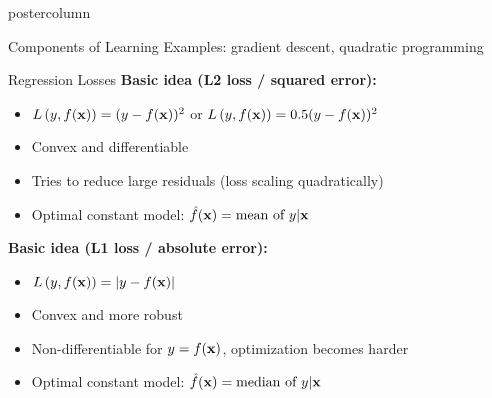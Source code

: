 \documentclass{beamer}
\begin{document}
\begin{frame}[fragile]{}
\begin{columns}
\begin{column}{.31\textwidth}
\begin{beamercolorbox}[center]{postercolumn}
\begin{minipage}{.98\textwidth}
{\begin{myblock}{Components of Learning}
          \hspace*{1ex} Examples: gradient descent, quadratic programming
        
            
          \end{myblock}
          \begin{myblock}{Regression Losses}
			        \textbf{Basic idea (L2 loss / squared error):} 
						\begin{itemize}    
						  \setlength{\itemindent}{+.3in}
              \item $L\left(y, f(\mathbf{x})\right) = (y-f(\mathbf{x}))^2$ or $L\left(y, f(\mathbf{x})\right) = 0.5 (y-f(\mathbf{x}))^2$
              \item Convex and differentiable
              \item Tries to reduce large residuals (loss scaling quadratically)
              \item Optimal constant model: $\hat{f}(\mathbf{x}) = \text{mean of } y | \mathbf{x}$
            \end{itemize}

            \vspace*{1ex}

            
              \textbf{Basic idea (L1 loss / absolute error):} 
            \begin{itemize}     \setlength{\itemindent}{+.3in}
              \item $L\left(y, f(\mathbf{x})\right) = |y-f(\mathbf{x})|$
              \item Convex and more robust
              \item Non-differentiable for $y = f(\mathbf{x})$, optimization becomes harder
              \item Optimal constant model: $\hat{f}(\mathbf{x}) = \text{median of } y | \mathbf{x}$      
            \end{itemize}
          \end{myblock}

}
\end{minipage}
\end{beamercolorbox}
\end{column}
\end{columns}
\end{frame}
\end{document}
